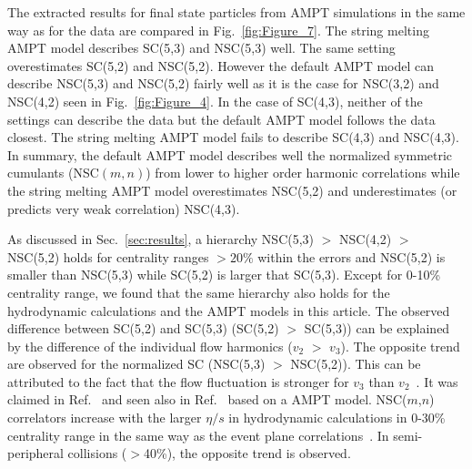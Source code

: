 The extracted results for final state particles from AMPT simulations in the same way as for the data are compared in Fig.~\ref{fig:Figure_7}.
The string melting AMPT model describes SC(5,3) and NSC(5,3) well. The same setting overestimates SC(5,2) and NSC(5,2). 
However the default AMPT model can describe NSC(5,3) and NSC(5,2) fairly well as it is the case for NSC(3,2) and NSC(4,2) seen in Fig.~\ref{fig:Figure_4}.
In the case of SC(4,3), neither of the settings can describe the data but the default AMPT model follows the data closest. 
The string melting AMPT model fails to describe SC(4,3) and NSC(4,3).
In summary, the default AMPT model describes well the normalized symmetric cumulants (NSC$(m,n)$) from lower to higher order harmonic correlations while the string melting AMPT model overestimates NSC(5,2) and underestimates (or predicts very weak correlation) NSC(4,3). 


 

As discussed in Sec.~\ref{sec:results}, a hierarchy NSC(5,3) $>$ NSC(4,2) $>$ NSC(5,2) holds for centrality ranges $>20\%$ within the errors and NSC(5,2) is smaller than NSC(5,3) while SC(5,2) is larger that SC(5,3).
Except for 0-10\% centrality range, we found that the same hierarchy also holds for the hydrodynamic calculations and the AMPT models in this article.
The observed difference between SC(5,2) and SC(5,3) (SC(5,2) $>$ SC(5,3)) can be explained by the difference of the individual flow harmonics ($v_2$ $>$ $v_3$). 
The opposite trend are observed for the normalized SC (NSC(5,3) $>$ NSC(5,2)). This can be attributed to the fact that the flow fluctuation is stronger for $v_3$ than $v_2$~\cite{Aad:2013xma}. It was claimed in Ref.~\cite{Zhu:2016puf} and seen also in Ref.~\cite{Bhalerao:2014xra} based on a AMPT model. 
NSC($m$,$n$) correlators increase with the larger $\eta/s$ in hydrodynamic calculations in 0-30\% centrality range in the same way as the event plane correlations~\cite{Bhalerao:2013ina,Teaney:2013dta}. In semi-peripheral collisions ($>$40\%), the opposite trend is observed.



